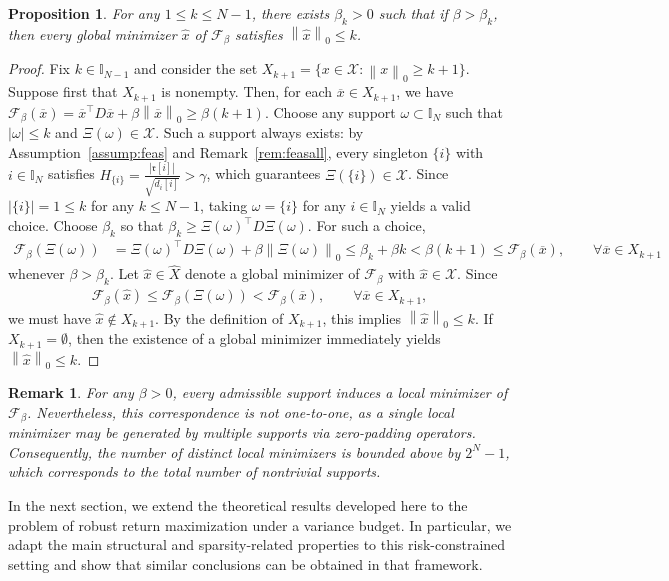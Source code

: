 \documentclass[11pt]{article}
\theoremstyle{plain}
\newtheorem{proposition}{Proposition}
\theoremstyle{definition}
\theoremstyle{plain}
\newtheorem{remark}{Remark}
\newcommand{\II}{{\mathbb I}}
\newcommand{\norm}[1]{\left\lVert#1\right\rVert}
\newcommand{\tpose}[1]{#1^{\top}}
\newcommand{\cF}{{\mathcal F}}
\newcommand{\cX}{{\mathcal X}}
\begin{document}
\begin{proposition} \label{prop:betak}
	For any $1\leq k\leq N-1$, there exists $\beta_k>0$ such that if $\beta > \beta_k$, then every global minimizer $\hat{x}$ of $\cF_\beta$ satisfies $\norm{\hat{x}}_0 \leq k$.
\end{proposition}
\begin{proof}
	Fix $k\in \mathbb I_{N-1}$ and consider the set $X_{k+1} =  \{ x\in \cX: \norm{x}_0 \geq k+1 \}$.	Suppose first that $X_{k+1}$ is nonempty. Then, for each $\overline{x} \in X_{k+1}$, we have $\cF_\beta(\overline{x})
	= \tpose{\overline{x}}D\overline{x}+\beta \norm{\overline{x}}_0
	\geq \beta(k+1)$. Choose any support $\omega \subset \mathbb{I}_N$ such that $|\omega| \leq k$ and $\Xi(\omega) \in \mathcal{X}$. Such a support always exists: by Assumption~\ref{assump:feas} and Remark~\ref{rem:feasall}, every singleton $\{i\}$ with $i \in \II_N$ satisfies
$H_{\{i\}} = \frac{|\mathfrak{r}[i]|}{\sqrt{d_i[i]}} > \gamma$,
which guarantees $\Xi(\{i\}) \in \mathcal{X}$. Since $|\{i\}| = 1 \leq k$ for any $k \leq N-1$, taking $\omega = \{i\}$ for any $i \in \mathbb I_N$ yields a valid choice. Choose $\beta_k$ so that
	$\beta_k \geq \tpose{\Xi(\omega)}D\Xi(\omega)$. For such a choice,
	\begin{align*}
		\cF_\beta (\Xi(\omega))
		&= \tpose{\Xi(\omega)}D\Xi(\omega) + \beta \norm{\Xi(\omega)}_0
		\leq \beta_k + \beta k
		< \beta(k+1)
		\leq \cF_\beta(\overline{x}),
		\qquad \forall \overline{x}\in X_{k+1}
	\end{align*}
	whenever $\beta>\beta_k$. Let $\hat{x}\in \hat{X}$ denote a global minimizer of $\cF_\beta$ with
	$\hat{x}\in \cX$. Since
	\begin{align*}
	\cF_\beta(\hat{x})
	\leq \cF_\beta(\Xi(\omega))
	< \cF_\beta(\overline{x}),
	\qquad \forall \overline{x}\in X_{k+1},
	\end{align*}
	we must have $\hat{x}\notin X_{k+1}$. By the definition of $X_{k+1}$, this implies $\norm{\hat{x}}_0 \leq k$. If $X_{k+1} = \emptyset$, then the existence of a global minimizer immediately yields $\norm{\hat{x}}_0\leq k$.
\end{proof}
\begin{remark}\label{rem:noofsols}
    For any $\beta>0$, every admissible support induces a local minimizer of $\cF_\beta$. Nevertheless, this correspondence is not one-to-one, as a single local minimizer may be generated by multiple supports via zero-padding operators. Consequently, the number of distinct local minimizers is bounded above by $2^N - 1$, which corresponds to the total number of nontrivial supports.
\end{remark}
In the next section, we extend the theoretical results developed here to the problem of robust return maximization under a variance budget. In particular, we adapt the main structural and sparsity-related properties to this risk-constrained setting and show that similar conclusions can be obtained in that framework.
\end{document}
